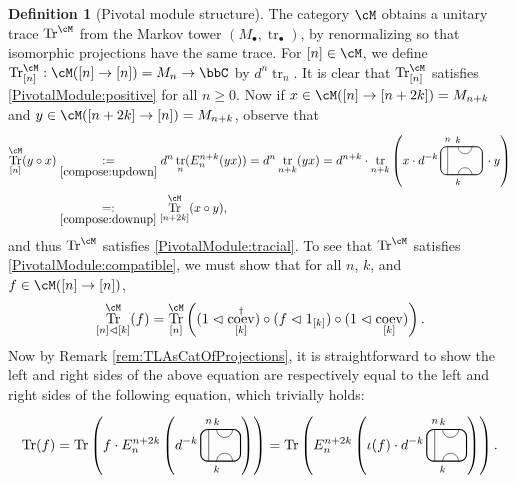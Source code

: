 \documentclass[11pt]{article}
\theoremstyle{plain}
\theoremstyle{definition}
\newtheorem{defn}[thm]{Definition}
\DeclareMathOperator{\coev}{coev}
\DeclareMathOperator{\Tr}{Tr}
\DeclareMathOperator{\tr}{tr}
\begin{document}
\begin{defn}[Pivotal module structure] 
\label{def:PivotalModuleFromMarkovTower}
The category $\cM$ obtains a unitary trace $\Tr^\cM$ from the Markov tower $(M_\bullet,\tr_\bullet)$, by renormalizing so that isomorphic projections have the same trace.
For $[n] \in \cM$, we define $\Tr^\cM_{[n]} : \cM([n] \to [n]) = M_n \to \bbC$ by $d^n \tr_n$.
It is clear that $\Tr^\cM_{[n]}$ satisfies \ref{PivotalModule:positive} for all $n\geq 0$.
Now if $x \in \cM([n] \to [n+ 2k])= M_{n+k}$ and $y\in \cM ([n+ 2k] \to [n]) = M_{n+ k}$, observe that 
\begin{align*}
\Tr^\cM_{[n]}(y\circ x)
&\underset{\ref{compose:updown}}{:=}
d^n\tr_n(E^{n+k}_n(yx))
=
d^n \tr_{n+k}(yx)
=
d^{n+k}
\cdot
\tr_{n+k}
\left(
x \cdot
d^{-k}\,
\begin{tikzpicture}[baseline = .3cm]
 \draw[thick, rounded corners = 5pt] (0,0) rectangle (1.2,.8);
 \draw (.2,0) -- (.2,.8);
 \draw (.5,.8) arc (-180:0:.2cm);
 \draw (.5,0) arc (180:0:.2cm);
 \node at (.2,1) {\scriptsize{$n$}};
 \node at (.5,1) {\scriptsize{$k$}};
 \node at (.5,-.2) {\scriptsize{$k$}};
\end{tikzpicture}\,
\cdot y
\right)
\\&\underset{\ref{compose:downup}}{=:}
\Tr^\cM_{[n+2k]}(x\circ y),
\end{align*}
and thus $\Tr^\cM$ satisfies \ref{PivotalModule:tracial}.
To see that $\Tr^\cM$ satisfies \ref{PivotalModule:compatible}, we must show that for all $n$, $k$, and $f\in\cM([n]\to[n])$,
 \[\Tr^\cM_{[n]\vartriangleleft[k]}(f)=\Tr^\cM_{[n]}\left((1\vartriangleleft\coev_{[k]}^\dag)\circ(f\vartriangleleft1_{[k]})\circ(1\vartriangleleft\coev_{[k]})\right).
 \]
 Now by Remark \ref{rem:TLAsCatOfProjections}, it is straightforward to show the left and right sides of the above equation are respectively equal to the left and right sides of the following equation, which trivially holds:
  \[
  \Tr(f)
  =
  \Tr\left(f\cdot E^{n+2k}_n\left(d^{-k}\,
  \begin{tikzpicture}[baseline=.3cm]
   \draw (.2,0) -- (.2,.8);
   \node at (.2,1) {\scriptsize{$n$}};
   \draw (.4,.8) arc (-180:0:.2cm);
   \node at (.4,1) {\scriptsize{$k$}};
   \draw (.4,0) arc (180:0:.2cm);
   \node at (.4,-.2) {\scriptsize{$k$}};
   \draw[thick, rounded corners = 5pt] (0,0) rectangle (1,.8);
  \end{tikzpicture}
 \right)\right)
 =
 \Tr\left(E^{n+2k}_n\left(\iota(f)\cdot d^{-k}\,
  \begin{tikzpicture}[baseline=.3cm]
   \draw (.2,0) -- (.2,.8);
   \node at (.2,1) {\scriptsize{$n$}};
   \draw (.4,.8) arc (-180:0:.2cm);
   \node at (.4,1) {\scriptsize{$k$}};
   \draw (.4,0) arc (180:0:.2cm);
   \node at (.4,-.2) {\scriptsize{$k$}};
   \draw[thick, rounded corners = 5pt] (0,0) rectangle (1,.8);
  \end{tikzpicture}
 \right)\right)
 \text{.}
 \]
\end{defn}
\end{document}
